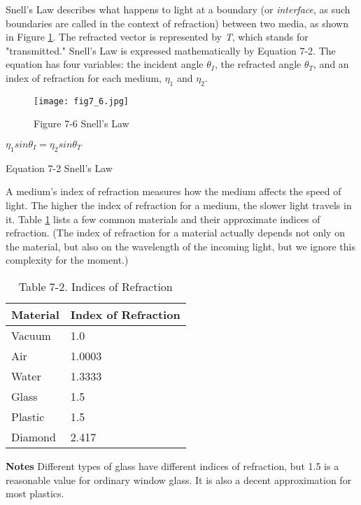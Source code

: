 \documentclass[../main.tex]{subfiles}
\begin{document}
Snell's Law describes what happens to light at a boundary (or \textit{interface}, as such boundaries are called in the context of refraction) between two media, as shown in Figure \ref{fig:7-6}. The refracted vector is represented by \textit{T}, which stands for "transmitted." Snell's Law is expressed mathematically by Equation 7-2. The equation has four variables: the incident angle $\theta_I$, the refracted angle $\theta_T $, and an index of refraction for each medium, $\eta_1$ and $\eta_2$.

\begin{figure}
    \centering
    \texttt{[image: fig7\_6.jpg]}
    \caption{Figure 7-6 Snell's Law}
    \label{fig:7-6}
\end{figure}

\FloatBarrier
\begin{equationcaption}
$
\eta_1sin\theta_I=\eta_2sin\theta_T
$
\caption{Equation 7-2 Snell's Law}
\end{equationcaption}
\FloatBarrier

A medium's index of refraction measures how the medium affects the speed of light. The higher the index of refraction for a medium, the slower light travels in it. Table \ref{table:7-2} lists a few common materials and their approximate indices of refraction. (The index of refraction for a material actually depends not only on the material, but also on the wavelength of the incoming light, but we ignore this complexity for the moment.)

\begin{table}
\centering
\begin{tabular}{ p{2cm} p{4cm} } 

Material & Index of Refraction \\
\hline

Vacuum & 1.0 \\
Air & 1.0003 \\
Water & 1.3333 \\
Glass & 1.5 \\
Plastic & 1.5 \\
Diamond & 2.417 \\

\hline

\end{tabular}

\caption{Table 7-2. Indices of Refraction}
\label{table:7-2}

\textbf{Notes}
Different types of glass have different indices of refraction, but 1.5 is a reasonable value for ordinary window glass. It is also a decent approximation for most plastics.

\end{table}
\end{document}
